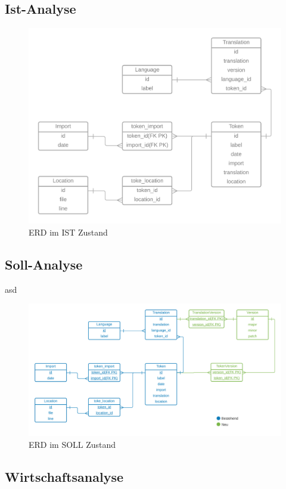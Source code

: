 \documentclass[oneside]{article}
\begin{document}
  \subsection{Ist-Analyse}
  \begin{figure}[h]
    \centering
    \includegraphics[width=\textwidth]{ERD_TranslationService_IST-Analyse.png}
    \caption{ERD im IST Zustand}
  \end{figure}
  \newpage
  \subsection{Soll-Analyse}
  asd
  \begin{figure}[h]
    \centering
    \includegraphics[width=\textwidth]{ERD_TranslationService_SOLL-Analyse.png}
    \caption{ERD im SOLL Zustand}
  \end{figure}  
  \subsection{Wirtschaftsanalyse}
\end{document}
